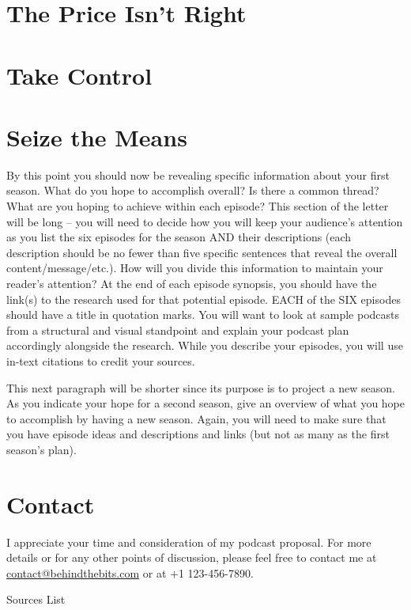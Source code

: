 \documentclass[12pt]{article}
\begin{document}
\section{The Price Isn't Right}

\section{Take Control}

\section{Seize the Means}

By this point you should now be revealing specific information about your first season. What do you hope to accomplish overall? Is there a common thread? What are you hoping to achieve within each episode? This section of the letter will be long – you will need to decide how you will keep your audience’s attention as you list the six episodes for the season AND their descriptions (each description should be no fewer than five specific sentences that reveal the overall content/message/etc.). How will you divide this information to maintain your reader’s attention? At the end of each episode synopsis, you should have the link(s) to the research used for that potential episode. EACH of the SIX episodes should have a title in quotation marks. You will want to look at sample podcasts from a structural and visual standpoint and explain your podcast plan accordingly alongside the research. While you describe your episodes, you will use in-text citations to credit your sources.

This next paragraph will be shorter since its purpose is to project a new season. As you indicate your hope for a second season, give an overview of what you hope to accomplish by having a new season. Again, you will need to make sure that you have episode ideas and descriptions and links (but not as many as the first season’s plan).

\section*{Contact}
I appreciate your time and consideration of my podcast proposal. For more
details or for any other points of discussion, please feel free to contact me at
\href{mailto:contact@behindthebits.com}{contact@behindthebits.com} or at +1 123-456-7890.

\clearpage
\begin{center}
  Sources List
\end{center}
\printbibliography[title={\relax}]
\end{document}
